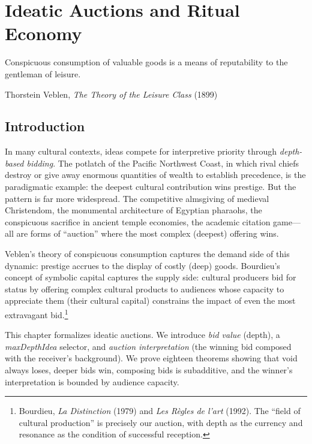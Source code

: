 
\chapter{Ideatic Auctions and Ritual Economy}
\label{ch:auction}

\epigraph{Conspicuous consumption of valuable goods is a means of reputability
to the gentleman of leisure.}{Thorstein Veblen,
\textit{The Theory of the Leisure Class} (1899)}

\section{Introduction}

In many cultural contexts, ideas compete for interpretive priority through
\emph{depth-based bidding}.  The potlatch of the Pacific Northwest Coast, in
which rival chiefs destroy or give away enormous quantities of wealth to
establish precedence, is the paradigmatic example: the deepest cultural
contribution wins prestige.  But the pattern is far more widespread.
The competitive almsgiving of medieval Christendom, the monumental
architecture of Egyptian pharaohs, the conspicuous sacrifice in ancient
temple economies, the academic citation game---all are forms of
``auction'' where the most complex (deepest) offering wins.

Veblen's theory of conspicuous consumption captures the demand side of this
dynamic: prestige accrues to the display of costly (deep) goods.
Bourdieu's concept of symbolic capital captures the supply side: cultural
producers bid for status by offering complex cultural products to
audiences whose capacity to appreciate them (their cultural capital)
constrains the impact of even the most extravagant bid.\footnote{Bourdieu,
\textit{La Distinction} (1979) and \textit{Les Règles de l'art} (1992).
The ``field of cultural production'' is precisely our auction, with
depth as the currency and resonance as the condition of successful
reception.}

This chapter formalizes ideatic auctions.  We introduce \emph{bid value}
(depth), a \emph{maxDepthIdea} selector, and \emph{auction interpretation}
(the winning bid composed with the receiver's background).  We prove
eighteen theorems showing that void always loses, deeper bids win,
composing bids is subadditive, and the winner's interpretation is bounded
by audience capacity.

